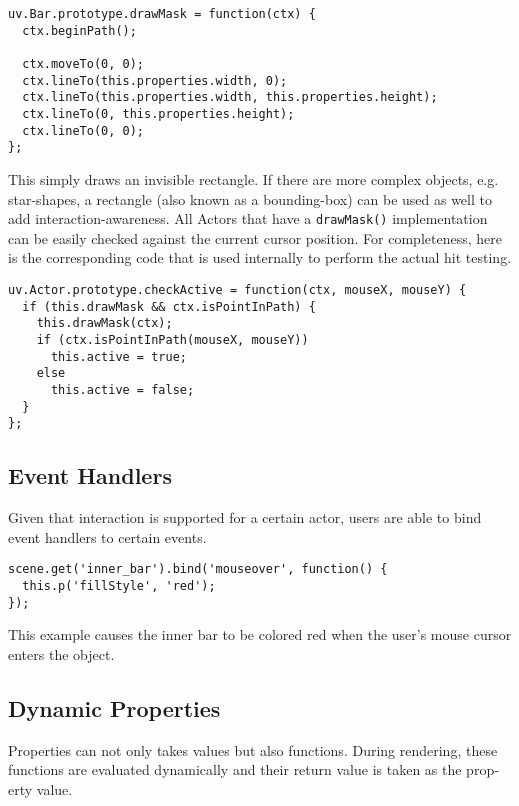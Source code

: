 \begin{english}
\begin{verbatim}
uv.Bar.prototype.drawMask = function(ctx) {
  ctx.beginPath();
  
  ctx.moveTo(0, 0);
  ctx.lineTo(this.properties.width, 0);
  ctx.lineTo(this.properties.width, this.properties.height);
  ctx.lineTo(0, this.properties.height);
  ctx.lineTo(0, 0);
};
\end{verbatim}

\SuperPar This simply draws an invisible rectangle. If there are more complex objects, e.g. star-shapes, a rectangle (also known as a bounding-box) can be used as well to add interaction-awareness. All Actors that have a \texttt{drawMask()} implementation can be easily checked against the current cursor position. For completeness, here is the corresponding code that is used internally to perform the actual hit testing.

\begin{verbatim}
uv.Actor.prototype.checkActive = function(ctx, mouseX, mouseY) {
  if (this.drawMask && ctx.isPointInPath) {
    this.drawMask(ctx);
    if (ctx.isPointInPath(mouseX, mouseY))
      this.active = true;
    else
      this.active = false;
  }
};
\end{verbatim}


\subsection{Event Handlers}

Given that interaction is supported for a certain actor, users are able to bind event handlers to certain events.

\begin{verbatim}
scene.get('inner_bar').bind('mouseover', function() {
  this.p('fillStyle', 'red');
});
\end{verbatim}

\SuperPar This example causes the inner bar to be colored red when the user's mouse cursor enters the object.

\subsection{Dynamic Properties}

Properties can not only takes values but also functions. During rendering, these functions are evaluated dynamically and their return value is taken as the property value.


\end{english}
